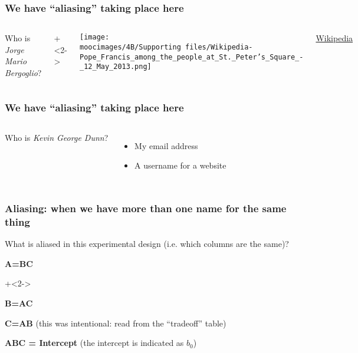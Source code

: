 \documentclass[handout,11pt,aspectratio=169,mathserif]{beamer}
\begin{document}
\begin{frame}\frametitle{We have ``aliasing'' taking place here}
	\begin{columns}
			 Who is \emph{Jorge Mario Bergoglio}?
		
		\onslide+<2->	{
			\texttt{[image: \\moocimages/4B/Supporting files/Wikipedia-Pope\_Francis\_among\_the\_people\_at\_St.\_Peter's\_Square\_-\_12\_May\_2013.png]}		

			{\scriptsize  \href{https://en.wikipedia.org/wiki/Pope\_Francis}{Wikipedia}}
			}
	\end{columns}
	
\end{frame}

\begin{frame}\frametitle{We have ``aliasing'' taking place here}
	\begin{columns}
		\column{0.48\textwidth}	
			 Who is \emph{Kevin George Dunn}?		

		\column{0.48\textwidth}
			\begin{itemize}
				\item	My email address
				\item	A username for a website
			\end{itemize}
	\end{columns}
	
\end{frame}

\begin{frame}\frametitle{Aliasing: when we have more than one name for the same thing}
	
	\vspace{1cm}
	What is aliased in this experimental design (i.e. which columns are the same)?
		
		\vspace{0.5cm}
		\begin{itemize}
			\item	\textbf{A=BC}
			
			\onslide+<2->	{
			\vspace{1cm}
			\item	\textbf{B=AC}
			
			\vspace{1cm}
			\item	\textbf{C=AB} (this was intentional: read from the ``tradeoff'' table)
			
			\vspace{1cm}
			\item	\textbf{ABC = Intercept} (the intercept is indicated as $b_0$)
			}
		\end{itemize}

\end{frame}
\end{document}
